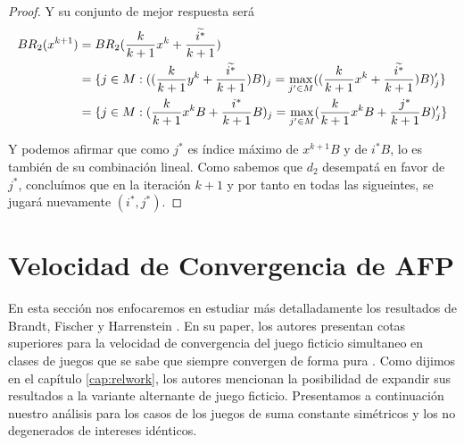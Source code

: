 \begin{proof}
    Y su conjunto de mejor respuesta será
    \begin{align*}
        BR_2(x^{k+1}) &= BR_2(\frac{k}{k+1} x^{k} + \frac{\widetilde{i^*}}{k+1}) \\
        &= \{
            j \in M :
            ((\frac{k}{k+1} y^{k} + \frac{\widetilde{i^*}}{k+1})B)_j
            = \max_{j' \in M} ((\frac{k}{k+1} x^{k} + \frac{\widetilde{i^*}}{k+1})B)_j'
        \}\\
        &= \{
            j \in M :
            (\frac{k}{k+1} x^{k}B + \frac{i^*}{k+1}B)_j =
            \max_{j' \in M} (\frac{k}{k+1} x^{k}B + \frac{j^*}{k+1}B)_j'
        \}
    \end{align*}

    Y podemos afirmar que como $j^*$ es índice máximo de $x^{k+1}B$ y de $i^*B$, lo es también de su combinación lineal. Como sabemos que $d_2$ desempatá en favor de $j^*$, concluímos que en la iteración $k+1$ y por tanto en todas las sigueintes, se jugará nuevamente $(i^*, j^*)$.


\end{proof}

\section{Velocidad de Convergencia de AFP} \label{sec:aportes:velocidad}

En esta sección nos enfocaremos en estudiar más detalladamente los resultados de Brandt, Fischer y Harrenstein \cite{brandt:rate:convergence}. En su paper, los autores presentan cotas superiores para la velocidad de convergencia del juego ficticio simultaneo en clases de juegos que se sabe que siempre convergen de forma pura . Como dijimos en el capítulo \ref{cap:relwork}, los autores mencionan la posibilidad de expandir sus resultados a la variante alternante de juego ficticio. Presentamos a continuación nuestro análisis para los casos de los juegos de suma constante simétricos y los no degenerados de intereses idénticos.

